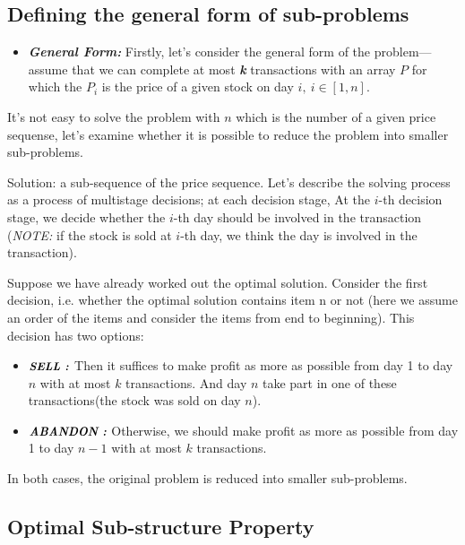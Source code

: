 \documentclass[UTF8,a4paper,12pt]{article}
\begin{document}
\begin{CJK}{UTF8}{gkai}
	
	\subsection{Defining the general form of sub-problems}
	
		\begin{itemize}
			\item \textbf{\textit{General Form: }} Firstly, let's consider the general form of the problem---assume that we can complete at most  \textbf{\textit{k}} transactions with an array $ P $ for which the $ P_{i} $ is the price of a given stock on day $ i,\ i\in[1,n]$.
		\end{itemize}
		
		It's not easy to solve the problem with $ n $ which is the number of a given price sequense, let's examine whether it is possible to reduce the problem into smaller sub-problems.
		
		Solution: a sub-sequence of the price sequence. Let’s describe the solving process as a process of multistage decisions; at each decision stage, At the $ i $-th decision stage, we decide whether the $ i $-th day should be involved in the transaction (\textit{NOTE:} if the stock is sold at $ i $-th day, we think the day is involved in the transaction).
		
		Suppose we have already worked out the optimal solution. Consider the first decision, i.e. whether the optimal solution contains item n or not (here we assume an order of the items and consider the items from end to beginning). This decision has two options:
		
		\begin{itemize}
			\item $\textbf{\textit{\small SELL :}}$ Then it suffices to make profit as more as possible from day 1 to day $ n $  with at most $ k $ transactions. And day $ n $ take part in one of these  transactions(the stock was sold on day $ n $).
			
			\item $\textbf{\textit{\small ABANDON :}}$ Otherwise, we should make profit as more as possible from day 1 to day $ n-1 $ with at most $ k $ transactions.
			
		\end{itemize}
		
		In both cases, the original problem is reduced into smaller sub-problems.
	
	\subsection{Optimal Sub-structure Property}
	

\end{CJK}
\end{document}
